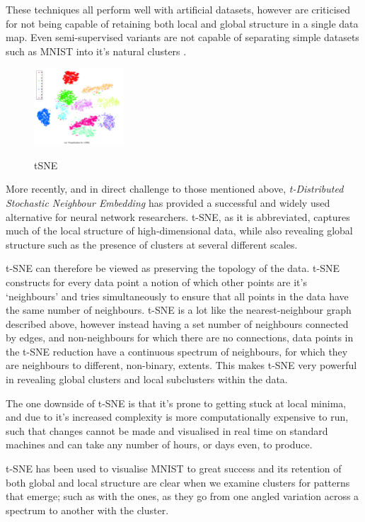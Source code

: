 \documentclass[a4paper,11pt,titlepage]{article}
\begin{document}
		\par 
		These techniques all perform well with artificial datasets, however are criticised for not being capable of retaining both local and global structure in a single data map. Even semi-supervised variants are not capable of separating simple datasets such as MNIST into it's natural clusters \cite{Song2007}. 
		\par 

	\begin{figure}[H]
    			\centering	
			{{\includegraphics[width=0.3\textwidth]
    				{img/hinton_tsne.png} 
    			}}%
    			\caption{tSNE}%
    		\label{fig:3nn}
	\end{figure}	  		
 		
		More recently, and in direct challenge to those mentioned above, \textit{t-Distributed Stochastic Neighbour Embedding} \cite{Maaten2008} has provided a successful and widely used alternative for neural network researchers. t-SNE, as it is abbreviated, captures much of the local structure of high-dimensional data, while also revealing global structure such as the presence of clusters at several different scales.
		\par 
		t-SNE can therefore be viewed as preserving the topology of the data. t-SNE constructs for every data point a notion of which other points are it's `neighbours' and tries simultaneously to ensure that all points in the data have the same number of neighbours. t-SNE is a lot like the nearest-neighbour graph described above, however instead having a set number of neighbours connected by edges, and non-neighbours for which there are no connections, data points in the t-SNE reduction have a continuous spectrum of neighbours, for which they are neighbours to different, non-binary, extents. This makes t-SNE very powerful in revealing global clusters and local subclusters within the data.
 		
		\par
		 The one downside of t-SNE is that it's prone to getting stuck at local minima, and due to it's increased complexity is more computationally expensive to run, such that changes cannot be made and visualised in real time on standard machines and can take any number of hours, or days even, to produce.  
		\par 
		t-SNE has been used to visualise MNIST to great success \cite{Maaten2008} and its retention of both global and local structure are clear when we examine clusters for patterns that emerge; such as with the ones, as they go from one angled variation across a spectrum to another with the cluster.
\end{document}

